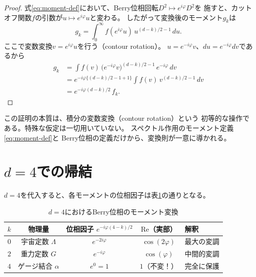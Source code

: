 \begin{proof}
式\eqref{eq:moment-def}において、Berry位相回転$D^2 \mapsto e^{i\varphi}D^2$を
施すと、カットオフ関数$f$の引数が$u \mapsto e^{i\varphi}u$と変わる。
したがって変換後のモーメント$g_k$は
\begin{equation}
g_k = \int_0^\infty f(e^{i\varphi}u)\, u^{(d-k)/2 - 1}\, du.
\end{equation}
ここで変数変換$v = e^{i\varphi}u$を行う（contour rotation）。
$u = e^{-i\varphi}v$、$du = e^{-i\varphi}dv$であるから
\begin{align}
g_k &= \int f(v)\, \bigl(e^{-i\varphi}v\bigr)^{(d-k)/2 - 1}\, e^{-i\varphi}\, dv \\
    &= e^{-i\varphi\{(d-k)/2 - 1 + 1\}} \int f(v)\, v^{(d-k)/2 - 1}\, dv \\
    &= e^{-i\varphi(d-k)/2}\, f_k.
\end{align}
\end{proof}

\begin{remark}
この証明の本質は、積分の変数変換（contour rotation）という
初等的な操作である。特殊な仮定は一切用いていない。
スペクトル作用のモーメント定義\eqref{eq:moment-def}と
Berry位相の定義だけから、変換則が一意に導かれる。
\end{remark}


\section{$d=4$での帰結}
\label{sec:7.4}

$d=4$を代入すると、各モーメントの位相因子は表\ref{tab:berry-phase-factors}の通りとなる。

\begin{table}[htbp]
\centering
\caption{$d=4$におけるBerry位相のモーメント変換}
\label{tab:berry-phase-factors}
\renewcommand{\arraystretch}{1.4}
\begin{tabular}{@{}ccccl@{}}
\toprule
$k$ & 物理量 & 位相因子 $e^{-i\varphi(4-k)/2}$ & $\mathrm{Re}$（実部） & 解釈 \\
\midrule
$0$ & 宇宙定数 $\Lambda$ & $e^{-2i\varphi}$ & $\cos(2\varphi)$ & 最大の変調 \\
$2$ & 重力定数 $G$ & $e^{-i\varphi}$ & $\cos(\varphi)$ & 中間的変調 \\
$4$ & ゲージ結合 $\alpha$ & $e^{0} = 1$ & $1$（不変！） & 完全に保護 \\
\bottomrule
\end{tabular}
\end{table}

